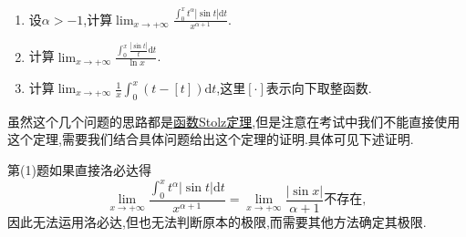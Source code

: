 \documentclass[../../main.tex]{subfiles}%
\begin{document}
\begin{example}\label{example:4.272123}
\begin{enumerate}[(1)]
\item 设\(\alpha > - 1\),计算\(\lim_{x\rightarrow +\infty}\frac{\int_{0}^{x}t^{\alpha}|\sin t|\mathrm{d}t}{x^{\alpha + 1}}\).

\item 计算\(\lim_{x\rightarrow +\infty}\frac{\int_{0}^{x}\frac{|\sin t|}{t}\mathrm{d}t}{\ln x}\).

\item  计算\(\lim_{x\rightarrow +\infty}\frac{1}{x}\int_{0}^{x}(t - [t])\mathrm{d}t\),这里\([\cdot]\)表示向下取整函数.
\end{enumerate}
\end{example}
\begin{note}
虽然这个几个问题的思路都是\hyperref[theorem:函数Stolz定理]{函数Stolz定理},但是注意在考试中我们不能直接使用这个定理,需要我们结合具体问题给出这个定理的证明.具体可见下述证明.
\end{note}
\begin{remark}
第(1)题如果直接洛必达得
\[
\lim_{x\rightarrow +\infty}\frac{\int_{0}^{x}t^{\alpha}|\sin t|\mathrm{d}t}{x^{\alpha + 1}}=\lim_{x\rightarrow +\infty}\frac{|\sin x|}{\alpha + 1}\text{不存在},
\]
因此无法运用洛必达,但也无法判断原本的极限,而需要其他方法确定其极限.
\end{remark}
\end{document}
